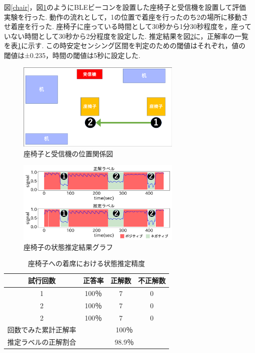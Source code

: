 \documentclass[Japanese]{dicomopapers}
\begin{document}
図\ref{chair}，図\ref{zaisu_position}のようにBLEビーコンを設置した座椅子と受信機を設置して評価実験を行った.
動作の流れとして，1の位置で着座を行ったのち2の場所に移動させ着座を行った.
座椅子に座っている時間として30秒から1分30秒程度を，座っていない時間として30秒から2分程度を設定した.
推定結果を図\ref{chair_graph}に，正解率の一覧を表\ref{chair_fig}に示す.
この時安定センシング区間を判定のための閾値はそれぞれ，値の閾値は±0.235，時間の閾値は5秒に設定した.


\begin{figure}[tbh]
    \centering
    \includegraphics[width=8cm]{zaisu_position.png}
    \caption{座椅子と受信機の位置関係図}
    \label{zaisu_position}
\end{figure}


\begin{figure}[tbh]
    \centering
    \includegraphics[width=8cm]{zaisu_graph.png}
    \caption{座椅子の状態推定結果グラフ}
    \label{chair_graph}
\end{figure}


\begin{table}[tbh]
    \begin{center}
        \caption{座椅子への着席における状態推定精度}
        \label{chair_fig}
        \begin{tabular}{|c|c|c|c|} \hline
        試行回数 & 正答率 & 正解数 & 不正解数 \\ \hline
        1 & 100％ & 7 & 0 \\ \hline
        2 & 100％ & 7 & 0 \\ \hline
        2 & 100％ & 7 & 0 \\ \hline \hline
        回数でみた累計正解率 & \multicolumn{3}{c|}{100％} \\ \hline \hline
        推定ラベルの正解割合 & \multicolumn{3}{c|}{98.9％} \\ \hline

        \end{tabular}
    \end{center}
\end{table}
\end{document}
